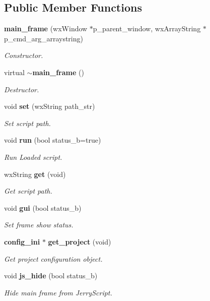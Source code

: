 \subsection*{Public Member Functions}
\begin{DoxyCompactItemize}
\item 
\textbf{ main\+\_\+frame} (wx\+Window $\ast$p\+\_\+parent\+\_\+window, wx\+Array\+String $\ast$p\+\_\+cmd\+\_\+arg\+\_\+arraystring)
\begin{DoxyCompactList}\small\item\em Constructor. \end{DoxyCompactList}\item 
virtual \textbf{ $\sim$main\+\_\+frame} ()
\begin{DoxyCompactList}\small\item\em Destructor. \end{DoxyCompactList}\item 
void \textbf{ set} (wx\+String path\+\_\+str)
\begin{DoxyCompactList}\small\item\em Set script path. \end{DoxyCompactList}\item 
void \textbf{ run} (bool status\+\_\+b=true)
\begin{DoxyCompactList}\small\item\em Run Loaded script. \end{DoxyCompactList}\item 
wx\+String \textbf{ get} (void)
\begin{DoxyCompactList}\small\item\em Get script path. \end{DoxyCompactList}\item 
void \textbf{ gui} (bool status\+\_\+b)
\begin{DoxyCompactList}\small\item\em Set frame show status. \end{DoxyCompactList}\item 
\textbf{ config\+\_\+ini} $\ast$ \textbf{ get\+\_\+project} (void)
\begin{DoxyCompactList}\small\item\em Get project configuration object. \end{DoxyCompactList}\item 
void \textbf{ js\+\_\+hide} (bool status\+\_\+b)
\begin{DoxyCompactList}\small\item\em Hide main frame from Jerry\+Script. \end{DoxyCompactList}\item 

\end{DoxyCompactItemize}
